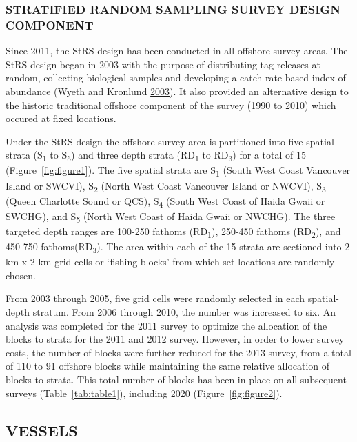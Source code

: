 \documentclass[12pt]{article}\usepackage[]{graphicx}\usepackage[]{color}
\begin{document}
\hypertarget{stratified-random-sampling-survey-design-component}{%
\subsubsection{STRATIFIED RANDOM SAMPLING SURVEY DESIGN COMPONENT}\label{stratified-random-sampling-survey-design-component}}

Since 2011, the StRS design has been conducted in all offshore survey areas. The StRS design began in 2003 with the purpose of distributing tag releases at random, collecting biological samples and developing a catch-rate based index of abundance (Wyeth and Kronlund \protect\hyperlink{ref-Wyeth2003}{2003}). It also provided an alternative design to the historic traditional offshore component of the survey (1990 to 2010) which occured at fixed locations.

Under the StRS design the offshore survey area is partitioned into five spatial strata (S\textsubscript{1} to S\textsubscript{5}) and three depth strata (RD\textsubscript{1} to RD\textsubscript{3}) for a total of 15 (Figure~\ref{fig:figure1}). The five spatial strata are S\textsubscript{1} (South West Coast Vancouver Island or SWCVI), S\textsubscript{2} (North West Coast Vancouver Island or NWCVI), S\textsubscript{3} (Queen Charlotte Sound or QCS), S\textsubscript{4} (South West Coast of Haida Gwaii or SWCHG), and S\textsubscript{5} (North West Coast of Haida Gwaii or NWCHG). The three targeted depth ranges are 100-250 fathoms (RD\textsubscript{1}), 250-450 fathoms (RD\textsubscript{2}), and 450-750 fathoms(RD\textsubscript{3}). The area within each of the 15 strata are sectioned into 2 km x 2 km grid cells or `fishing blocks' from which set locations are randomly chosen.

From 2003 through 2005, five grid cells were randomly selected in each spatial-depth stratum. From 2006 through 2010, the number was increased to six. An analysis was completed for the 2011 survey to optimize the allocation of the blocks to strata for the 2011 and 2012 survey. However, in order to lower survey costs, the number of blocks were further reduced for the 2013 survey, from a total of 110 to 91 offshore blocks while maintaining the same relative allocation of blocks to strata. This total number of blocks has been in place on all subsequent surveys (Table~\ref{tab:table1}), including 2020 (Figure~\ref{fig:figure2}).

\hypertarget{vessels}{%
\subsection{VESSELS}\label{vessels}}
\end{document}
